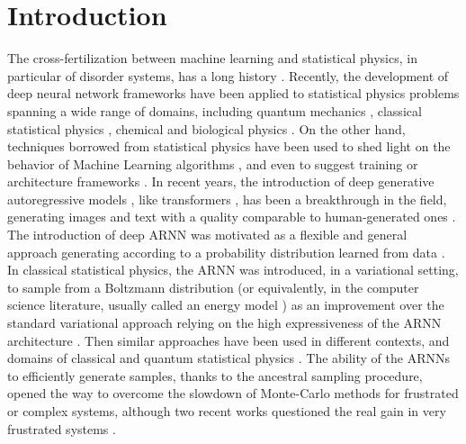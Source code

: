 \documentclass[aps,physrev,10pt,floatfix,reprint]{revtex4-2}
\begin{document}
\section{Introduction} 
The cross-fertilization between machine learning and statistical physics, in particular of disorder systems, has a long history \cite{doi:10.1073/pnas.79.8.2554, PhysRevA.32.1007}.
Recently, the development of deep neural network frameworks \cite{bengioNatureDeepLearning2015} have been applied to statistical physics problems \cite{RevModPhys.91.045002} spanning a wide range of domains, including quantum mechanics \cite{doi:10.1126/science.aag2302, Nieuwenburg2017}, 
classical statistical physics \cite{Carrasquilla2017, Wu2019}, chemical and biological physics \cite{noe2019boltzmann,jumper2021highly}.
On the other hand, techniques borrowed from statistical physics have been used to shed light on the behavior of Machine Learning algorithms \cite{doi:10.1080/00018732.2016.1211393, Nguyen2017}, and even to suggest training or architecture frameworks \cite{Chaudhari_2019, pmlr-v37-sohl-dickstein15}.
In recent years, the introduction of deep generative autoregressive models \cite{pmlr-v37-germain15, NIPS2016_b1301141}, like transformers \cite{NIPS2017_3f5ee243}, has been a breakthrough in the field, generating images and text with a quality comparable to human-generated ones \cite{https://doi.org/10.48550/arxiv.2005.14165}.  
The introduction of deep ARNN was motivated as a flexible and general approach generating according to a probability distribution learned from data \cite{pmlr-v32-gregor14, pmlr-v15-larochelle11a, pmlr-v48-oord16}. In classical statistical physics, the ARNN was introduced, in a variational setting, to sample from a Boltzmann distribution (or equivalently, in the computer science literature, usually called an energy model \cite{pmlr-v97-durkan19a}) as an improvement over the standard variational approach relying on the high expressiveness of the ARNN architecture \cite{Wu2019}. Then similar approaches have been used in different contexts, and domains of classical \cite{10.1103/physreve.101.023304,PhysRevE.101.053312,PhysRevE.103.012103,PhysRevResearch.3.L042024,10.1038/s42256-021-00401-3} and quantum statistical physics \cite{10.1103/physrevlett.128.090501,PhysRevA.102.062413,PhysRevLett.124.020503,PhysRevResearch.2.023358, Liu_2021, Barrett2022}. The ability of the ARNNs to efficiently generate samples, thanks to the ancestral sampling procedure, opened the way to overcome the slowdown of Monte-Carlo methods for frustrated or complex systems, although two recent works questioned the real gain in very frustrated systems \cite{condmat7020038,https://doi.org/10.48550/arxiv.2210.11145}.
\end{document}
